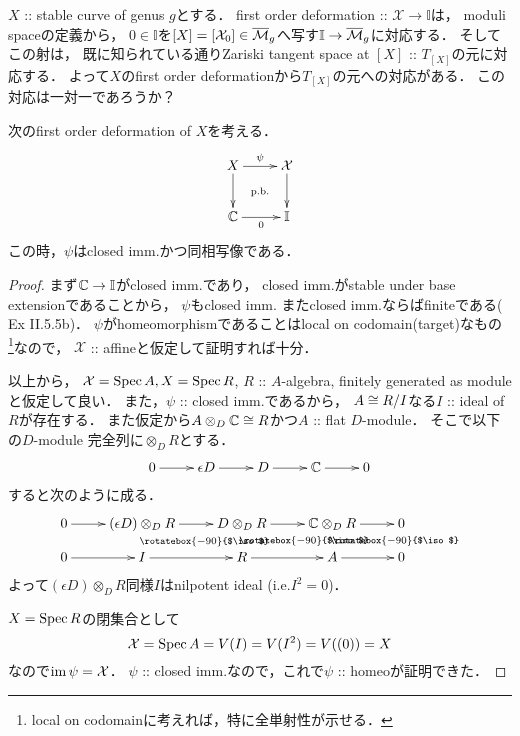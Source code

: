 \documentclass[a4paper]{jsarticle}
\makeatletter
\newcommand{\dualnum}{\mathbb{I}}
\newcommand{\viso}{\rotatebox{-90}{$\iso$}}
\newcommand{\centerpb}{\ar@{}[lu]|{\text{p.b.}}}
\newcommand{\defX}{\mathcal{X}}
\makeatother
\begin{document}
    \begin{Remark}
        $X$ :: stable curve of genus $g$とする．
        first order deformation :: $\defX \to \dualnum$は，
        moduli spaceの定義から，
        $0 \in \dualnum$を$[X]=[\defX_0] \in \barM_g$へ写す$\dualnum \to \barM_g$に対応する．
        そしてこの射は，
        既に知られている通りZariski tangent space at $[X]$ :: $T_{[X]}$の元に対応する．
        よって$X$のfirst order deformationから$T_{[X]}$の元への対応がある．
        この対応は一対一であろうか？
    \end{Remark}

    \begin{Lemma}\label{lemma:psi_is_imm_homeo}
        次のfirst order deformation of $X$を考える．
        \[\vcenter{\xymatrix{
            X \ar[r]^-{\psi} \ar[d]& \defX \ar[d] \\
            \C \ar[r]_-{0}& \dualnum
            \centerpb
        }}\]
        この時，$\psi$はclosed imm.かつ同相写像である．
    \end{Lemma}
    \begin{proof}
        まず$\C \to \dualnum$がclosed imm.であり，
        closed imm.がstable under base extensionであることから，
        $\psi$もclosed imm.
        またclosed imm.ならばfiniteである(\cite{HarAG} Ex II.5.5b)．
        $\psi$がhomeomorphismであることはlocal on codomain(target)なもの
        \footnote{ local on codomainに考えれば，特に全単射性が示せる． }なので，
        $\defX$ :: affineと仮定して証明すれば十分．
        
        以上から，
        $\defX=\Spec A, X=\Spec R$,
        $R$ :: $A$-algebra, finitely generated as module
        と仮定して良い．
        また，$\psi$ :: closed imm.であるから，
        $A \cong R/I$なる$I$ :: ideal of $R$が存在する．
        また仮定から$A \otimes_D \mathbb{C} \cong R$かつ$A$ :: flat $D$-module．
        そこで以下の$D$-module 完全列に$\otimes_D R$とする．
        \[\xymatrix{
            0 \ar[r]& \epsilon D \ar[r]& D \ar[r]& \C \ar[r]& 0
        }\]
        すると次のように成る．
        \[\xymatrix@R=10pt{
            0 \ar[r]& (\epsilon D)\otimes_D R \ar[r]& D \otimes_D R \ar[r]& \C \otimes_D R \ar[r]& 0 \\
            0 \ar[r]& I \ar@<5pt>@{}[u]_-{\viso} \ar[r]& R \ar@<5pt>@{}[u]_-{\viso}\ar[r]& A \ar@<5pt>@{}[u]_-{\viso}\ar[r]& 0 \\
        }\]
        よって$(\epsilon D)\otimes_D R$同様$I$はnilpotent ideal (i.e.$I^2=0$)．

        $X=\operatorname{Spec} R$の閉集合として
        \[ \defX=\Spec A=V(I)=V(I^2)=V((0))=X \]
        なので$\im \psi=\defX$．
        $\psi$ :: closed imm.なので，これで$\psi$ :: homeoが証明できた．
    \end{proof}
\end{document}
